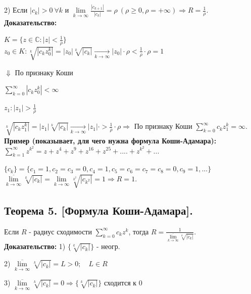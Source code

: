 \documentclass[a4paper,12pt]{article} %
\begin{document}
 2) Если $|c_k| > 0 \  \forall k \text{ и } \lim\limits_{k \to \infty} \frac{|c_{k+1}|}{|c_k|} = \rho \ (\rho \geqslant 0, \rho = +\infty) \Rightarrow R = \frac{1}{\rho}$.\\

 \textbf{Доказательство:}

 $K = \{z \in \mathbb{C}: |z| < \frac{1}{\rho} \}$ \\

 $z_0 \in K: \sqrt[k]{|c_k z_0^k|} = |z_0| \sqrt[k]{|c_k|} \underset{k \to \infty}{\longrightarrow} |z_0| \cdot \rho < \frac{1}{\rho} \cdot \rho = 1 $
 
\hspace*{3 cm} $\Downarrow$ По признаку Коши

\hspace*{3 cm}$\sum\limits_{k = 0}^\infty |c_k z_0^k| < \infty$

$z_1: |z_1| > \frac{1}{\rho}$

$\sqrt[k]{|c_k z_1^k|} = |z_1| \sqrt[k]{|c_k|} \underset{k \to \infty}{\longrightarrow} |z_1| \cdot > \frac{1}{\rho} \cdot \rho \Rightarrow
$ По признаку Коши $\sum\limits_{k = 0}^\infty c_k z_1^k = \infty$.\\

\textbf{Пример (показывает, для чего нужна формула Коши-Адамара):}\\
$\sum\limits_{k = 1}^\infty z^{k^2} = z + z^4 + z^9 + z^{16} + z^{25} + .... + z^{k^2} + ...
$

$ \{c_k\} = \{ c_1 = 1, c_2 = c_3 = 0, c_4 = 1, c_5 = c_6 = c_7 = c_8 = 0, c_9 = 1, ... \} $\\

$\overline{\lim\limits_{k \to \infty}} \sqrt[k]{|c_k|} = \lim\limits_{k \to \infty} \sqrt[k^2]{|c_{k^2}|} = 1 \Rightarrow R = 1$.\\ 

\subsection{Теорема 5. [Формула Коши-Адамара].}
Если $R$ - радиус сходимости $\sum\limits_{k = 0}^\infty c_k z^k$, тогда $ R = \frac{1}{\overline{\lim\limits_{k \to \infty}} \sqrt[k]{|c_k|}} $.\\

\textbf{Доказательство:}
1) $ \{ \sqrt[k]{|c_k|}\} $ - неогр.

2) $ \overline{\lim\limits_{k \to \infty} }\sqrt[k]{|c_k|}  = L > 0; \quad L \in R$

3) $ \overline{\lim\limits_{k \to \infty} }\sqrt[k]{|c_k|}  = 0 \Rightarrow \{ \sqrt[k]{|c_k|}\}$ сходится к 0
\end{document}
